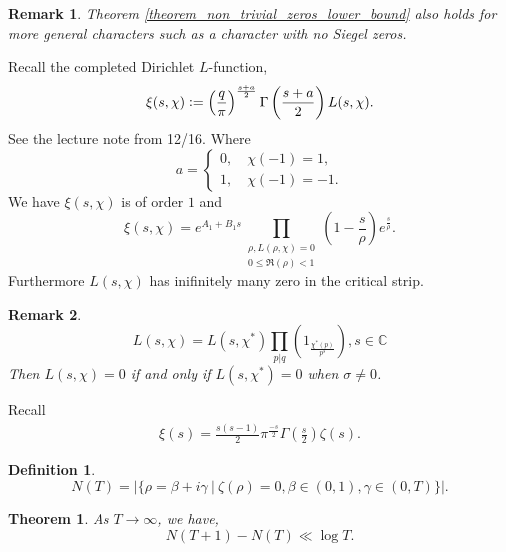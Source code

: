 \documentclass{article}
\newtheorem{theorem}{Theorem} [section]
\newtheorem{definition}{Definition}[section]
\newtheorem{remark}{Remark}[section]
\newcommand{\defeq}{\vcentcolon=}
\newcommand{\C}[0]{\mathbb{C}}
\newcommand{\sep}[0]{\:|\:}
\begin{document}
\begin{remark}
  Theorem \ref{theorem_non_trivial_zeros_lower_bound} also holds for more general characters such as a character with no Siegel zeros.
\end{remark}
Recall the completed Dirichlet $L$-function,
\begin{equation*}
  \xi(s,\chi)\defeq\left( {\frac q \pi}\right)^{{\frac {s+a} 2}}\Gamma\left({\frac {s+a} 2}\right)L(s,\chi).
\end{equation*}
See the lecture note from 12/16. Where 
\begin{equation*}
  a =\begin{cases}
    0,\quad\chi(-1)=1,\\
    1,\quad\chi(-1)=-1.
  \end{cases}
\end{equation*}
We have $\xi(s,\chi)$ is of order $1$ and 
\begin{equation*}
  \xi(s,\chi) = e^{A_1+B_1s}\prod_{\substack{\rho,L(\rho,\chi)=0\\0\leq\Re(\rho)<1}}\left(1-{\frac s \rho}\right)e^{{\frac s \rho}}.
\end{equation*}
Furthermore $L(s,\chi)$ has inifinitely many zero in the critical strip.
\begin{remark}
  \begin{equation*}
    L(s,\chi) = L(s,\chi^*)\prod_{p|q}\left(1_{\frac {\chi^*(p)} {p^s}}\right),s\in\C
  \end{equation*}
  Then $L(s,\chi)=0$ if and only if $L(s,\chi^*)=0$ when $\sigma\not=0$.
\end{remark}
Recall
\begin{align*}
  \xi(s) = {\frac {s(s-1)} {2}}\pi^{{\frac {-s} 2}}\Gamma\left({\frac s 2}\right)\zeta(s).
\end{align*}
\begin{definition}
  \begin{equation*}
    N(T) = \vert\{\rho=\beta+i\gamma\sep \zeta(\rho)=0, \beta\in(0,1),\gamma\in(0,T)\}\vert.
  \end{equation*}
\end{definition}
\begin{theorem}
  As $T\to \infty$, we have,
  \begin{equation*}
    N(T+1)-N(T)\ll \log T.
  \end{equation*}
\end{theorem}
\end{document}
